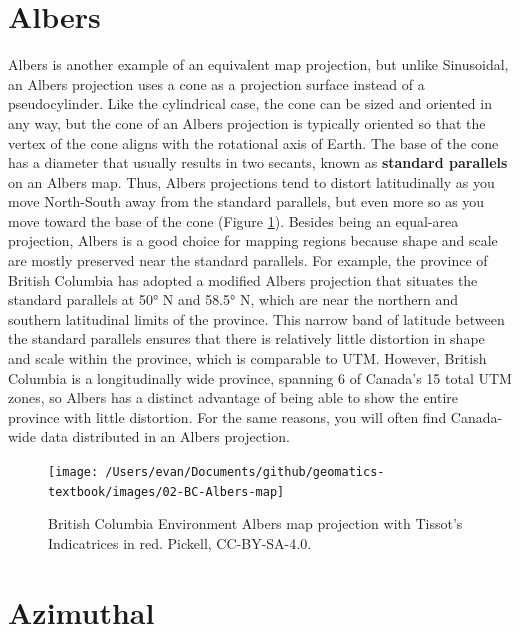 \documentclass[
]{book}
\begin{document}
\hypertarget{albers}{%
\section{Albers}\label{albers}}

Albers is another example of an equivalent map projection, but unlike Sinusoidal, an Albers projection uses a cone as a projection surface instead of a pseudocylinder. Like the cylindrical case, the cone can be sized and oriented in any way, but the cone of an Albers projection is typically oriented so that the vertex of the cone aligns with the rotational axis of Earth. The base of the cone has a diameter that usually results in two secants, known as \textbf{standard parallels} on an Albers map. Thus, Albers projections tend to distort latitudinally as you move North-South away from the standard parallels, but even more so as you move toward the base of the cone (Figure \ref{fig:2-BC-Albers-map}). Besides being an equal-area projection, Albers is a good choice for mapping regions because shape and scale are mostly preserved near the standard parallels. For example, the province of British Columbia has adopted a modified Albers projection that situates the standard parallels at 50° N and 58.5° N, which are near the northern and southern latitudinal limits of the province. This narrow band of latitude between the standard parallels ensures that there is relatively little distortion in shape and scale within the province, which is comparable to UTM. However, British Columbia is a longitudinally wide province, spanning 6 of Canada's 15 total UTM zones, so Albers has a distinct advantage of being able to show the entire province with little distortion. For the same reasons, you will often find Canada-wide data distributed in an Albers projection.

\begin{figure}
\texttt{[image: /Users/evan/Documents/github/geomatics-textbook/images/02-BC-Albers-map]} \caption{British Columbia Environment Albers map projection with Tissot's Indicatrices in red. Pickell, CC-BY-SA-4.0.}\label{fig:2-BC-Albers-map}
\end{figure}

\hypertarget{azimuthal}{%
\section{Azimuthal}\label{azimuthal}}
\end{document}
